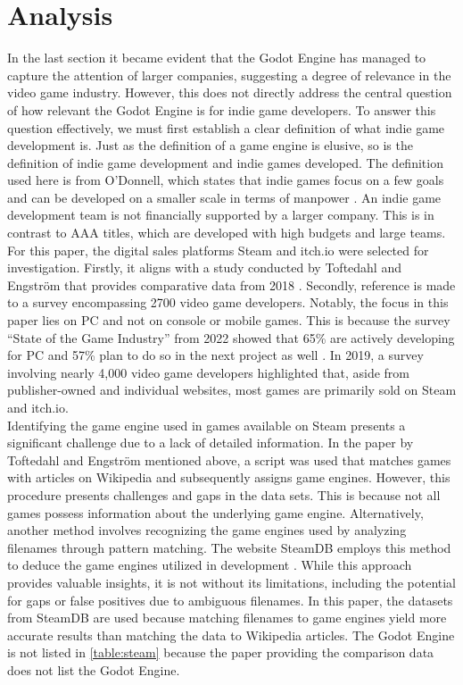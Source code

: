 \section{Analysis}
In the last section it became evident that the Godot Engine has managed to capture the attention of larger companies, suggesting a degree of relevance in the video game industry.
However, this does not directly address the central question of how relevant the Godot Engine is for indie game developers.
To answer this question effectively, we must first establish a clear definition of what indie game development is.
Just as the definition of a game engine is elusive, so is the definition of indie game development and indie games developed.
The definition used here is from O'Donnell, which states that indie games focus on a few goals and can be developed on a smaller scale in terms of manpower \cite{indie-definition}.
An indie game development team is not financially supported by a larger company.
This is in contrast to AAA titles, which are developed with high budgets and large teams.\\

For this paper, the digital sales platforms Steam and itch.io were selected for investigation.
Firstly, it aligns with a study conducted by Toftedahl and Engström that provides comparative data from 2018 \cite{game-engine-taxonomy}.
Secondly, reference is made to a survey encompassing 2700 video game developers.
Notably, the focus in this paper lies on PC and not on console or mobile games.
This is because the survey ``State of the Game Industry'' from 2022 showed that 65\% are actively developing for PC and 57\% plan to do so in the next project as well \cite{gdc-2023}.
In 2019, a survey involving nearly 4,000 video game developers highlighted that, aside from publisher-owned and individual websites, most games are primarily sold on Steam and itch.io. \cite{gdc-2019}\\

Identifying the game engine used in games available on Steam presents a significant challenge due to a lack of detailed information.
In the paper by Toftedahl and Engström mentioned above, a script was used that matches games with articles on Wikipedia and subsequently assigns game engines.
However, this procedure presents challenges and gaps in the data sets.
This is because not all games possess information about the underlying game engine.
Alternatively, another method involves recognizing the game engines used by analyzing filenames through pattern matching.
The website SteamDB employs this method to deduce the game engines utilized in development \cite{steamdb-tech}.
While this approach provides valuable insights, it is not without its limitations, including the potential for gaps or false positives due to ambiguous filenames.
In this paper, the datasets from SteamDB are used because matching filenames to game engines yield more accurate results than matching the data to Wikipedia articles.
The Godot Engine is not listed in \autoref{table:steam} because the paper providing the comparison data does not list the Godot Engine. \\

